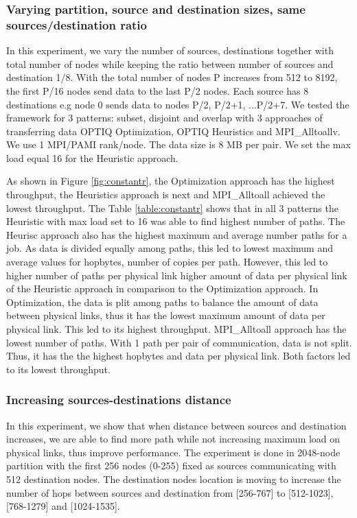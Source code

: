\subsubsection{Varying partition, source and destination sizes, same sources/destination ratio}

In this experiment, we vary the number of sources, destinations together with total number of nodes while keeping the ratio between number of sources and destination 1/8. With the total number of nodes P  increases from 512 to 8192, the first P/16 nodes send data to the last P/2 nodes. Each source has 8 destinations e.g node 0 sends data to nodes P/2, P/2+1, ...P/2+7. We tested the framework for 3 patterns: subset, disjoint and overlap with 3 approaches of transferring data OPTIQ Optimization, OPTIQ Heuristics and MPI\_Alltoallv. We use 1 MPI/PAMI rank/node. The data size is 8 MB per pair. We set the max load equal 16 for the Heuristic approach.

As shown in Figure \ref{fig:constantr}, the Optimization approach has the highest throughput, the Heuristics approach is next and MPI\_Alltoall achieved the lowest throughput. The Table \ref{table:constantr} shows that in all 3 patterns the Heuristic with max load set to 16 was able to find highest number of paths. The Heurisc approach also has the highest maximum and average number paths for a job. As data is divided equally among paths, this led to lowest maximum and average values for hopbytes, number of copies per path. However, this led to higher number of paths per physical link higher amount of data per physical link of the Heuristic approach in comparison to the Optimization approach. In Optimization, the data is plit among paths to balance the amount of data between physical links, thus it has the lowest maximum amount of data per physical link. This led to its highest throughput. MPI\_Alltoall approach has the lowest number of paths. With 1 path per pair of communication, data is not split. Thus, it has the the highest hopbytes and data per physical link. Both factors led to its lowest throughput.

\subsubsection{Increasing sources-destinations distance}

In this experiment, we show that when distance between sources and destination increases, we are able to find more path while not increasing maximum load on physical links, thus improve performance. The experiment is done in 2048-node partition with the first 256 nodes (0-255) fixed as sources communicating with 512 destination nodes. The destination nodes location is moving to increase the number of hops between sources and destination from [256-767] to [512-1023], [768-1279] and [1024-1535]. 


